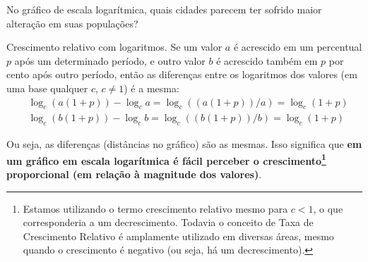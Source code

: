 \begin{reflection}
No gráfico de escala logarítmica, quais cidades parecem ter sofrido maior alteração em suas populações?
\end{reflection}



\begin{observation}{Crescimento relativo com logaritmos.}
Se um valor $a$ é acrescido em um percentual $p$ após um determinado período, e outro valor $b$ é acrescido também em $p$ por cento após outro período, então as diferenças entre os logaritmos dos valores (em uma base qualquer $c$, $c\neq 1$) é a mesma:
\begin{align*}
&\log_c (a(1+p))-\log_c a = \log_c ((a(1+p))/a)= \log_c (1+p)\\
&\log_c (b(1+p))-\log_c b = \log_c ((b(1+p))/b)= \log_c (1+p)
\end{align*}

Ou seja, as diferenças (distâncias no gráfico) são as mesmas. Isso significa que \textbf{em um gráfico em escala logarítmica é fácil perceber o crescimento\footnote{Estamos utilizando o termo crescimento relativo mesmo para $c<1$, o que corresponderia a um decrescimento. Todavia o conceito de Taxa de Crescimento Relativo é amplamente utilizado em diversas áreas, mesmo quando o crescimento é negativo (ou seja, há um decrescimento).} proporcional (em relação à magnitude dos valores)}.
\end{observation}



